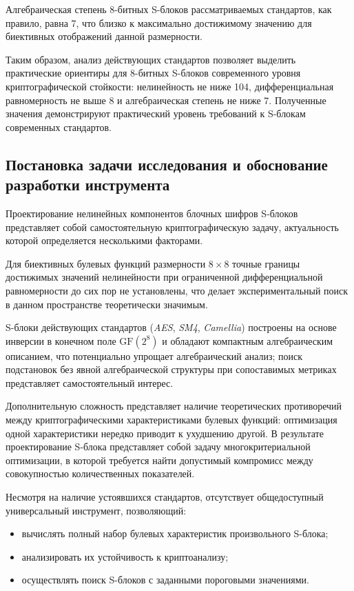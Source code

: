Алгебраическая степень 8-битных S-блоков рассматриваемых стандартов,
как правило, равна 7, что близко к максимально достижимому значению
для биективных отображений данной размерности.

Таким образом, анализ действующих стандартов позволяет выделить
практические ориентиры для 8-битных S-блоков современного уровня
криптографической стойкости: нелинейность не ниже 104,
дифференциальная равномерность не выше 8 и алгебраическая степень
не ниже 7. Полученные значения демонстрируют практический уровень
требований к S-блокам современных стандартов.

\subsection{Постановка задачи исследования и обоснование разработки инструмента}
Проектирование нелинейных компонентов блочных шифров S-блоков
представляет собой самостоятельную криптографическую задачу, актуальность
которой определяется несколькими факторами. 

Для биективных булевых функций размерности $8 \times 8$ точные границы достижимых
значений нелинейности при ограниченной дифференциальной равномерности
до сих пор не установлены, что делает экспериментальный поиск в данном
пространстве теоретически значимым. 

S-блоки действующих стандартов (\textit{AES}, \textit{SM4}, \textit{Camellia}) построены на основе инверсии в конечном
поле $\mathrm{GF}(2^8)$ и обладают компактным алгебраическим описанием,
что потенциально упрощает алгебраический анализ; поиск подстановок без
явной алгебраической структуры при сопоставимых метриках представляет
самостоятельный интерес.

Дополнительную сложность представляет наличие теоретических
противоречий между криптографическими характеристиками булевых функций: оптимизация одной характеристики нередко приводит к ухудшению другой. В результате проектирование S-блока
представляет собой задачу многокритериальной оптимизации, в которой
требуется найти допустимый компромисс между совокупностью количественных
показателей.

Несмотря на наличие устоявшихся стандартов, отсутствует общедоступный
универсальный инструмент, позволяющий:
\begin{itemize}
    \item вычислять полный набор булевых характеристик произвольного S-блока;
    \item анализировать их устойчивость к криптоанализу;
    \item осуществлять поиск S-блоков с заданными пороговыми значениями.
\end{itemize}

